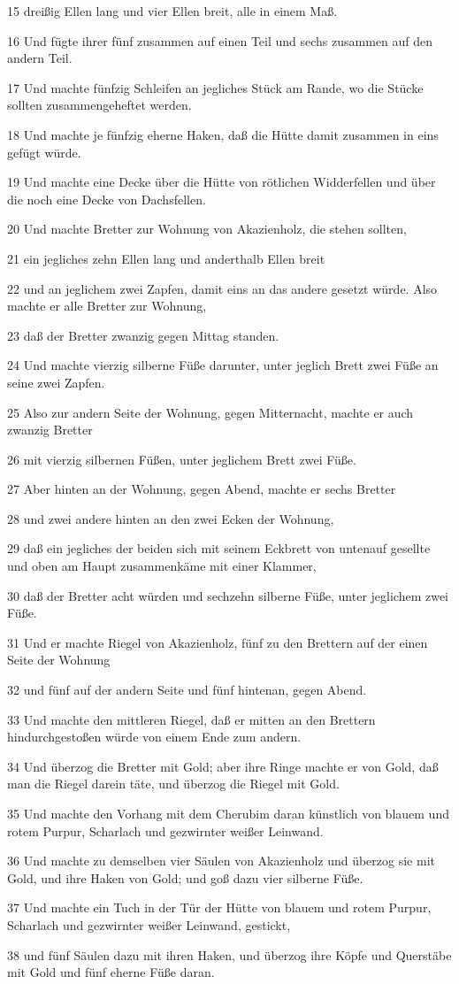 \par 15 dreißig Ellen lang und vier Ellen breit, alle in einem Maß.
\par 16 Und fügte ihrer fünf zusammen auf einen Teil und sechs zusammen auf den andern Teil.
\par 17 Und machte fünfzig Schleifen an jegliches Stück am Rande, wo die Stücke sollten zusammengeheftet werden.
\par 18 Und machte je fünfzig eherne Haken, daß die Hütte damit zusammen in eins gefügt würde.
\par 19 Und machte eine Decke über die Hütte von rötlichen Widderfellen und über die noch eine Decke von Dachsfellen.
\par 20 Und machte Bretter zur Wohnung von Akazienholz, die stehen sollten,
\par 21 ein jegliches zehn Ellen lang und anderthalb Ellen breit
\par 22 und an jeglichem zwei Zapfen, damit eins an das andere gesetzt würde. Also machte er alle Bretter zur Wohnung,
\par 23 daß der Bretter zwanzig gegen Mittag standen.
\par 24 Und machte vierzig silberne Füße darunter, unter jeglich Brett zwei Füße an seine zwei Zapfen.
\par 25 Also zur andern Seite der Wohnung, gegen Mitternacht, machte er auch zwanzig Bretter
\par 26 mit vierzig silbernen Füßen, unter jeglichem Brett zwei Füße.
\par 27 Aber hinten an der Wohnung, gegen Abend, machte er sechs Bretter
\par 28 und zwei andere hinten an den zwei Ecken der Wohnung,
\par 29 daß ein jegliches der beiden sich mit seinem Eckbrett von untenauf gesellte und oben am Haupt zusammenkäme mit einer Klammer,
\par 30 daß der Bretter acht würden und sechzehn silberne Füße, unter jeglichem zwei Füße.
\par 31 Und er machte Riegel von Akazienholz, fünf zu den Brettern auf der einen Seite der Wohnung
\par 32 und fünf auf der andern Seite und fünf hintenan, gegen Abend.
\par 33 Und machte den mittleren Riegel, daß er mitten an den Brettern hindurchgestoßen würde von einem Ende zum andern.
\par 34 Und überzog die Bretter mit Gold; aber ihre Ringe machte er von Gold, daß man die Riegel darein täte, und überzog die Riegel mit Gold.
\par 35 Und machte den Vorhang mit dem Cherubim daran künstlich von blauem und rotem Purpur, Scharlach und gezwirnter weißer Leinwand.
\par 36 Und machte zu demselben vier Säulen von Akazienholz und überzog sie mit Gold, und ihre Haken von Gold; und goß dazu vier silberne Füße.
\par 37 Und machte ein Tuch in der Tür der Hütte von blauem und rotem Purpur, Scharlach und gezwirnter weißer Leinwand, gestickt,
\par 38 und fünf Säulen dazu mit ihren Haken, und überzog ihre Köpfe und Querstäbe mit Gold und fünf eherne Füße daran.

